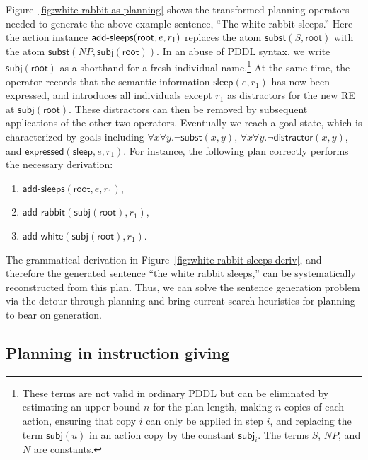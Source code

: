 Figure~\ref{fig:white-rabbit-as-planning} shows the
transformed planning operators needed to generate the above example
sentence, ``The white rabbit sleeps.'' Here the action instance
$\mathsf{add}\textsf{-}\mathsf{sleeps}(\mathsf{root}, e, r_1)$ replaces the atom
$\mathsf{subst}(S,\mathsf{root})$ with the atom
$\mathsf{subst}(NP,\mathsf{subj}(\mathsf{root}))$. In an abuse of PDDL
syntax, we write $\mathsf{subj}(\mathsf{root})$ as a shorthand for a fresh
individual name.\footnote{These terms are not valid in
  ordinary PDDL but can be eliminated by estimating an upper bound $n$
  for the plan length, making $n$ copies of each action, ensuring that
  copy $i$ can only be applied in step $i$, and replacing the term
  $\mathsf{subj}(u)$ in an action copy by the constant
  $\mathsf{subj}_i$. The terms $S$, $NP$, and $N$ are constants.}
At the same time, the operator records that
the semantic information $\mathsf{sleep}(e,r_1)$ has now been
expressed, and introduces all individuals except $r_1$ as
distractors for the new RE at $\mathsf{subj}(\mathsf{root})$. These
distractors can then be removed by subsequent applications of the
other two operators. Eventually we reach a goal state, which is
characterized by goals including $\forall x \forall y. \neg
\mathsf{subst}(x,y)$, $\forall x \forall y. \neg
\mathsf{distractor}(x,y)$, and
$\mathsf{expressed}(\mathsf{sleep},e,r_1)$. For instance, the following
plan correctly performs the necessary derivation:
%
\begin{enumerate}
\item $\mathsf{add}\textsf{-}\mathsf{sleeps}(\mathsf{root}, e, r_1)$,
\item $\mathsf{add}\textsf{-}\mathsf{rabbit}(\mathsf{subj}(\mathsf{root}),r_1)$,
\item $\mathsf{add}\textsf{-}\mathsf{white}(\mathsf{subj}(\mathsf{root}),r_1)$.
\end{enumerate}
%
The grammatical derivation in
Figure~\ref{fig:white-rabbit-sleeps-deriv}, and therefore the
generated sentence ``the white rabbit sleeps,'' can be systematically
reconstructed from this plan. Thus, we can solve the sentence
generation problem via the detour through planning and bring current
search heuristics for planning to bear on generation.


\subsection{Planning in instruction giving}
\label{sec:domain-give}

